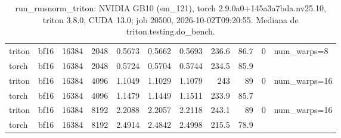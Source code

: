 \begin{table}[htbp]
\begin{tabular}{llrrrrrrrll}
    triton & bf16 & 16384 & 2048 & 0.5673 & 0.5662 & 0.5693 & 236.6 & 86.7 & 0 & num\_warps=8 \\
    torch & bf16 & 16384 & 2048 & 0.5724 & 0.5704 & 0.5744 & 234.5 & 85.9 &  &  \\
    triton & bf16 & 16384 & 4096 & 1.1049 & 1.1029 & 1.1079 & 243 & 89 & 0 & num\_warps=16 \\
    torch & bf16 & 16384 & 4096 & 1.1479 & 1.1449 & 1.1511 & 233.9 & 85.7 &  &  \\
    triton & bf16 & 16384 & 8192 & 2.2088 & 2.2057 & 2.2118 & 243.1 & 89 & 0 & num\_warps=16 \\
    torch & bf16 & 16384 & 8192 & 2.4914 & 2.4842 & 2.4998 & 215.5 & 78.9 &  &  \\
    \bottomrule
  \end{tabular}
  \caption{run\_rmsnorm\_triton: NVIDIA GB10 (sm\_121), torch 2.9.0a0+145a3a7bda.nv25.10, triton 3.8.0, CUDA 13.0; job 20500, 2026-10-02T09:20:55. Mediana de triton.testing.do\_bench.}
  \label{tab:run-rmsnorm-triton}
\end{table}
